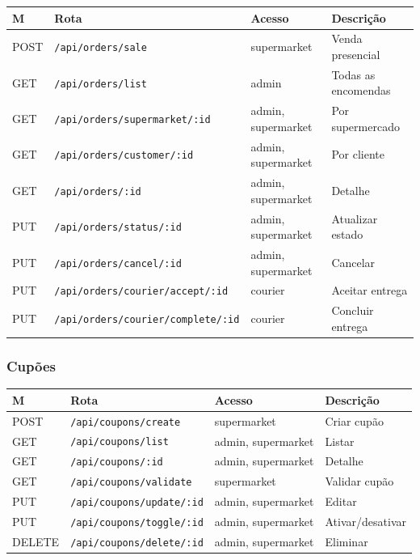 \documentclass[12pt,a4paper]{article}
\begin{document}
\begin{center}
\begin{tabular}{llll}
\toprule
\textbf{M} & \textbf{Rota} & \textbf{Acesso} & \textbf{Descrição} \\
\midrule
POST   & \texttt{/api/orders/sale}                  & supermarket & Venda presencial \\
GET    & \texttt{/api/orders/list}                  & admin & Todas as encomendas \\
GET    & \texttt{/api/orders/supermarket/:id}       & admin, supermarket & Por supermercado \\
GET    & \texttt{/api/orders/customer/:id}          & admin, supermarket & Por cliente \\
GET    & \texttt{/api/orders/:id}                   & admin, supermarket & Detalhe \\
PUT    & \texttt{/api/orders/status/:id}            & admin, supermarket & Atualizar estado \\
PUT    & \texttt{/api/orders/cancel/:id}            & admin, supermarket & Cancelar \\
PUT    & \texttt{/api/orders/courier/accept/:id}    & courier & Aceitar entrega \\
PUT    & \texttt{/api/orders/courier/complete/:id}  & courier & Concluir entrega \\
\bottomrule
\end{tabular}
\end{center}

\subsubsection{Cupões}

\begin{center}
\begin{tabular}{llll}
\toprule
\textbf{M} & \textbf{Rota} & \textbf{Acesso} & \textbf{Descrição} \\
\midrule
POST   & \texttt{/api/coupons/create}          & supermarket & Criar cupão \\
GET    & \texttt{/api/coupons/list}            & admin, supermarket & Listar \\
GET    & \texttt{/api/coupons/:id}             & admin, supermarket & Detalhe \\
GET    & \texttt{/api/coupons/validate}        & supermarket & Validar cupão \\
PUT    & \texttt{/api/coupons/update/:id}      & admin, supermarket & Editar \\
PUT    & \texttt{/api/coupons/toggle/:id}      & admin, supermarket & Ativar/desativar \\
DELETE & \texttt{/api/coupons/delete/:id}      & admin, supermarket & Eliminar \\
\bottomrule
\end{tabular}
\end{center}
\end{document}
